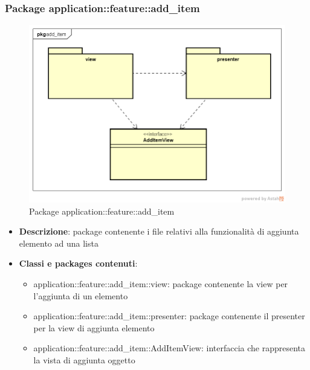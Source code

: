 \subsubsection{Package application::feature::add\_item}
\label{Package application::feature::add_item}
\begin{figure}[H]
	\centering
	\includegraphics[scale=0.5]{Sezioni/Packages/Application/add_item.png}
	\caption{Package application::feature::add\_item}
\end{figure}
\begin{itemize}
	\item \textbf{Descrizione}: package contenente i file relativi alla funzionalità di aggiunta elemento ad una lista
	\item \textbf{Classi e packages contenuti}:
	\begin{itemize}
	\item application::feature::add\_item::view: package contenente la view per l'aggiunta di un elemento
	\item application::feature::add\_item::presenter: package contenente il presenter per la view di aggiunta elemento
	\item application::feature::add\_item::AddItemView: interfaccia che rappresenta la vista di aggiunta oggetto
	\end{itemize}
\end{itemize}

